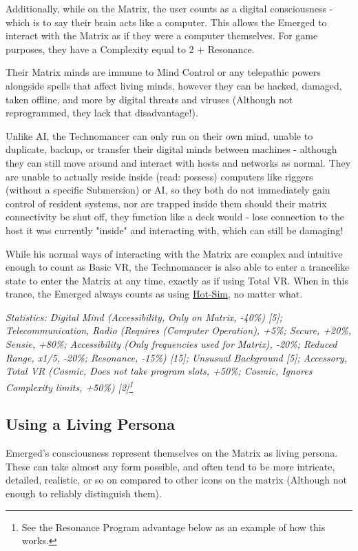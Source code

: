 \begin{multicols*}{3}
	Additionally, while on the Matrix, the user counts as a digital consciousness - which is to say their brain acts like a computer. This allows the Emerged to interact with the Matrix as if they were a computer themselves. For game purposes, they have a Complexity equal to 2 + Resonance.
	
	Their Matrix minds are immune to Mind Control or any telepathic powers alongside spells that affect living minds, however they can be hacked, damaged, taken offline, and more by digital threats and viruses (Although not reprogrammed, they lack that disadvantage!). 
	
	Unlike AI, the Technomancer can only run on their own mind, unable to duplicate, backup, or transfer their digital minds between machines - although they can still move around and interact with hosts and networks as normal. They are unable to actually reside inside (read: possess) computers like riggers (without a specific Submersion) or AI, so they both do not immediately gain control of resident systems, nor are trapped inside them should their matrix connectivity be shut off, they function like a deck would - lose connection to the host it was currently "inside" and interacting with, which can still be damaging!
	
	While his normal ways of interacting with the Matrix are complex and intuitive enough to count as Basic VR, the Technomancer is also able to enter a trancelike state to enter the Matrix at any time, exactly as if using Total VR. When in this trance, the Emerged always counts as using \hyperref[sim_mode]{Hot-Sim}, no matter what.
	
	\textit{\textcolor{OliveGreen}{Statistics: Digital Mind (Accessibility, Only on Matrix, -40\%) [5]; Telecommunication, Radio (Requires (Computer Operation), +5\%; Secure, +20\%, Sensie, +80\%; Accessibility (Only frequencies used for Matrix), -20\%; Reduced Range, x1/5, -20\%; Resonance, -15\%) [15]; Unsusual Background [5]; Accessory, Total VR (Cosmic, Does not take program slots, +50\%; Cosmic, Ignores Complexity limits, +50\%) [2]\footnote{See the Resonance Program advantage below as an example of how this works.}}}
	
	\subsection{Using a Living Persona}
	
	Emerged's consciousness represent themselves  on the Matrix as living persona. These can take almost any form possible, and often tend to be more intricate, detailed, realistic, or so on compared to other icons on the matrix (Although not enough to reliably distinguish them). 
	

\end{multicols*}
